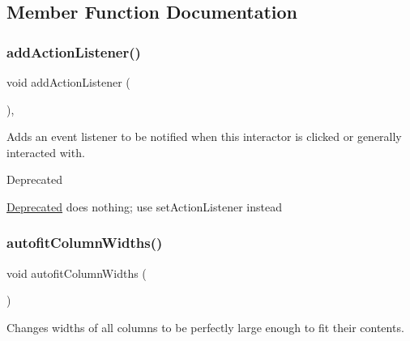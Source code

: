 \subsection{Member Function Documentation}
\mbox{\label{classsgl_1_1GInteractor_a02f20ea6edfa0671f31c4c648a253833}} 
\subsubsection{\texorpdfstring{add\+Action\+Listener()}{addActionListener()}}
{\footnotesize\ttfamily void add\+Action\+Listener (\begin{DoxyParamCaption}{ }\end{DoxyParamCaption})\hspace{0.3cm}{\ttfamily [virtual]}, {\ttfamily [inherited]}}



Adds an event listener to be notified when this interactor is clicked or generally interacted with. 

\begin{DoxyRefDesc}{Deprecated}
\item[\mbox{\hyperlink{deprecated__deprecated000006}{Deprecated}}]does nothing; use set\+Action\+Listener instead \end{DoxyRefDesc}
\mbox{\label{classsgl_1_1GTable_afaf36ccb6a75432b5f5463613ef01ef4}} 
\subsubsection{\texorpdfstring{autofit\+Column\+Widths()}{autofitColumnWidths()}}
{\footnotesize\ttfamily void autofit\+Column\+Widths (\begin{DoxyParamCaption}{ }\end{DoxyParamCaption})\hspace{0.3cm}{\ttfamily [virtual]}}



Changes widths of all columns to be perfectly large enough to fit their contents. 

